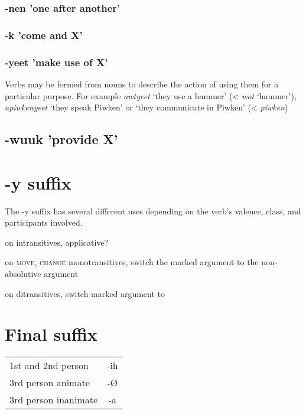 \documentclass[smallroyalvopaper,9pt]{memoir}
\begin{document}
\subsubsection{-nen 'one after another'}

\subsubsection{-k 'come and X'}

\subsubsection{-yeet 'make use of X'}

Verbs may be formed from nouns to describe the action of using them for a particular purpose. For example \textit{awtyeet} `they use a hammer' (< \textit{wot} `hammer'), \textit{apiwkenyeet} `they speak Piwken' or `they communicate in Piwken' (< \textit{piwken}) 

\subsection{-wuuk 'provide X'}

\section{-y suffix}

The -y suffix has several different uses depending on the verb's valence, class, and participants involved.

on intransitives, applicative?

on \textsc{move, change} monotransitives, switch the marked argument to the non-absolutive argument

on ditransitives, switch marked argument to 

\section{Final suffix}

\begin{table}[ht]
    \centering
    \begin{tabular}{lc}
        \toprule
        1st and 2nd person & -ih \\
        3rd person animate & -Ø \\
        3rd person inanimate & -a \\
        \bottomrule
    \end{tabular}
\end{table}
\end{document}
